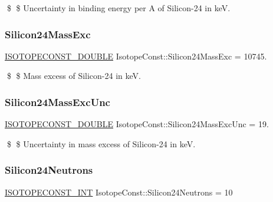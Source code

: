 \$ \$ Uncertainty in binding energy per A of Silicon-\/24 in keV. \mbox{\label{group___isotope_const-_silicon-_si24_ga348ed1d89e4aeec5119fdd97af4621a6}} 
\subsubsection{\texorpdfstring{Silicon24\+Mass\+Exc}{Silicon24MassExc}}
{\footnotesize\ttfamily \mbox{\hyperlink{group___isotope_const-_macros_ga8f45a7272ce02c0b4c65c44636ed719a}{I\+S\+O\+T\+O\+P\+E\+C\+O\+N\+S\+T\+\_\+\+D\+O\+U\+B\+LE}} Isotope\+Const\+::\+Silicon24\+Mass\+Exc = 10745.}

\$ \$ Mass excess of Silicon-\/24 in keV. \mbox{\label{group___isotope_const-_silicon-_si24_ga19de0d400c002123fb1a466bb3f7e94c}} 
\subsubsection{\texorpdfstring{Silicon24\+Mass\+Exc\+Unc}{Silicon24MassExcUnc}}
{\footnotesize\ttfamily \mbox{\hyperlink{group___isotope_const-_macros_ga8f45a7272ce02c0b4c65c44636ed719a}{I\+S\+O\+T\+O\+P\+E\+C\+O\+N\+S\+T\+\_\+\+D\+O\+U\+B\+LE}} Isotope\+Const\+::\+Silicon24\+Mass\+Exc\+Unc = 19.}

\$ \$ Uncertainty in mass excess of Silicon-\/24 in keV. \mbox{\label{group___isotope_const-_silicon-_si24_ga58b30f53af67159cd1434151e5c86d25}} 
\subsubsection{\texorpdfstring{Silicon24\+Neutrons}{Silicon24Neutrons}}
{\footnotesize\ttfamily \mbox{\hyperlink{group___isotope_const-_macros_ga5f18360b3e99483a35c32d789e62621c}{I\+S\+O\+T\+O\+P\+E\+C\+O\+N\+S\+T\+\_\+\+I\+NT}} Isotope\+Const\+::\+Silicon24\+Neutrons = 10}

